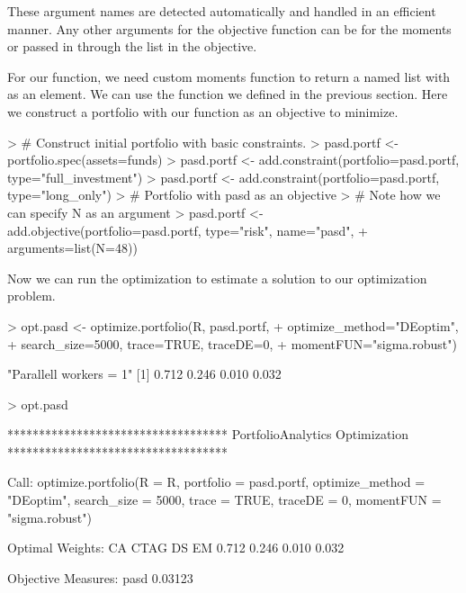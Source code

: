 \documentclass[a4paper]{article}
\begin{document}
These argument names are detected automatically and handled in an efficient manner. Any other arguments for the objective function can be for the moments or passed in through the  list in the objective.

For our  function, we need custom moments function to return a named list with  as an element. We can use the  function we defined in the previous section. Here we construct a portfolio with our  function as an objective to minimize.

\begin{Schunk}
\begin{Sinput}
> # Construct initial portfolio with basic constraints.
> pasd.portf <- portfolio.spec(assets=funds)
> pasd.portf <- add.constraint(portfolio=pasd.portf, type="full_investment")
> pasd.portf <- add.constraint(portfolio=pasd.portf, type="long_only")
> # Portfolio with pasd as an objective
> # Note how we can specify N as an argument
> pasd.portf <- add.objective(portfolio=pasd.portf, type="risk", name="pasd", 
+                             arguments=list(N=48))
\end{Sinput}
\end{Schunk}


Now we can run the optimization to estimate a solution to our optimization problem.
\begin{Schunk}
\begin{Sinput}
> opt.pasd <- optimize.portfolio(R, pasd.portf, 
+                                optimize_method="DEoptim", 
+                                search_size=5000, trace=TRUE, traceDE=0,
+                                momentFUN="sigma.robust")
\end{Sinput}
\begin{Soutput}
[1] "Parallell workers = 1"
[1] 0.712 0.246 0.010 0.032
\end{Soutput}
\begin{Sinput}
> opt.pasd
\end{Sinput}
\begin{Soutput}
***********************************
PortfolioAnalytics Optimization
***********************************

Call:
optimize.portfolio(R = R, portfolio = pasd.portf, optimize_method = "DEoptim", 
    search_size = 5000, trace = TRUE, traceDE = 0, momentFUN = "sigma.robust")

Optimal Weights:
   CA  CTAG    DS    EM 
0.712 0.246 0.010 0.032 

Objective Measures:
   pasd 
0.03123 
\end{Soutput}
\end{Schunk}
\end{document}
